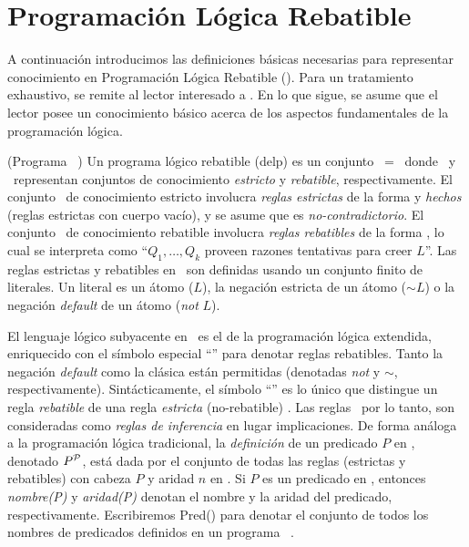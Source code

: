 \section{Programación Lógica Rebatible}


A continuación introducimos las definiciones básicas necesarias para representar conocimiento
en Programación Lógica Rebatible (\DLP). Para un tratamiento exhaustivo, se remite al lector
interesado a %
. En lo que sigue, se asume que el lector posee un conocimiento básico acerca de los aspectos
fundamentales de la programación lógica. 

\begin{definicion}(Programa \DLP\ \PP)
	Un programa lógico rebatible (delp) es un conjunto \PP\ = \SD\ donde \SSet\ y \DD\ representan conjuntos
	de conocimiento \textit{estricto} y \textit{rebatible}, respectivamente. El conjunto \SSet\ de 
	conocimiento estricto involucra \textit{reglas estrictas} de la forma  y 					\textit{hechos} (reglas estrictas con cuerpo vacío), y se asume que es \textit{no-contradictorio}. 
	El conjunto \DD\ de conocimiento rebatible involucra \textit{reglas rebatibles} de la forma 
	, lo cual se interpreta como ``$Q_1,\ldots,Q_k$ proveen razones tentativas 
	para creer $L$''. Las reglas estrictas y rebatibles en \DLP\ son definidas usando un conjunto 
	finito de literales. Un literal es un átomo ($L$), la negación estricta de un átomo ($\sim L$) o 
	la negación \textit{default} de un átomo (\textit{not} $L$).
\end{definicion}

El lenguaje lógico subyacente en \DLP\ es el de la programación lógica extendida, %
enriquecido con el símbolo especial ``\drule{}{}'' para denotar reglas rebatibles. Tanto la negación 
\textit{default} como la clásica están permitidas (denotadas \textit{not} y \textit{$\sim$}, respectivamente).
Sintácticamente, el símbolo ``\drule{}{}'' es lo único que distingue un regla \textit{rebatible} 
 de una regla \textit{estricta} (no-rebatible) . 
Las reglas \DLP\, por lo tanto, son consideradas como \textit{reglas de inferencia} en lugar implicaciones.
De forma análoga a la programación lógica tradicional, la \textit{definición} de un predicado $P$ en \PP ,
denotado $P^{\scriptsize{\mbox{${\mathcal P}$}}}$, está dada por el conjunto de todas las reglas (estrictas y rebatibles) con cabeza $P$ 
y aridad $n$ en \PP . Si $P$ es un predicado en \PP , entonces \textit{nombre(P)} y \textit{aridad(P)} denotan
el nombre y la aridad del predicado, respectivamente. Escribiremos \textsf{Pred}(\PP) para denotar el conjunto
de todos los nombres de predicados definidos en un programa \DLP\ \PP.

